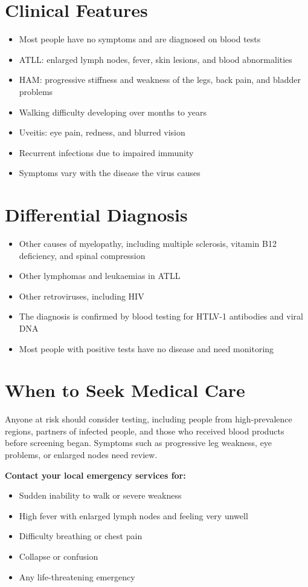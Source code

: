 \section*{Clinical Features}
\begin{itemize}
    \item Most people have no symptoms and are diagnosed on blood tests
    \item ATLL: enlarged lymph nodes, fever, skin lesions, and blood abnormalities
    \item HAM: progressive stiffness and weakness of the legs, back pain, and bladder problems
    \item Walking difficulty developing over months to years
    \item Uveitis: eye pain, redness, and blurred vision
    \item Recurrent infections due to impaired immunity
    \item Symptoms vary with the disease the virus causes
\end{itemize}

\section*{Differential Diagnosis}
\begin{itemize}
    \item Other causes of myelopathy, including multiple sclerosis, vitamin B12 deficiency, and spinal compression
    \item Other lymphomas and leukaemias in ATLL
    \item Other retroviruses, including HIV
    \item The diagnosis is confirmed by blood testing for HTLV-1 antibodies and viral DNA
    \item Most people with positive tests have no disease and need monitoring
\end{itemize}

\section*{When to Seek Medical Care}
Anyone at risk should consider testing, including people from high-prevalence regions, partners of infected people, and those who received blood products before screening began. Symptoms such as progressive leg weakness, eye problems, or enlarged nodes need review.

\textbf{Contact your local emergency services for:}
\begin{itemize}
    \item Sudden inability to walk or severe weakness
    \item High fever with enlarged lymph nodes and feeling very unwell
    \item Difficulty breathing or chest pain
    \item Collapse or confusion
    \item Any life-threatening emergency
\end{itemize}

